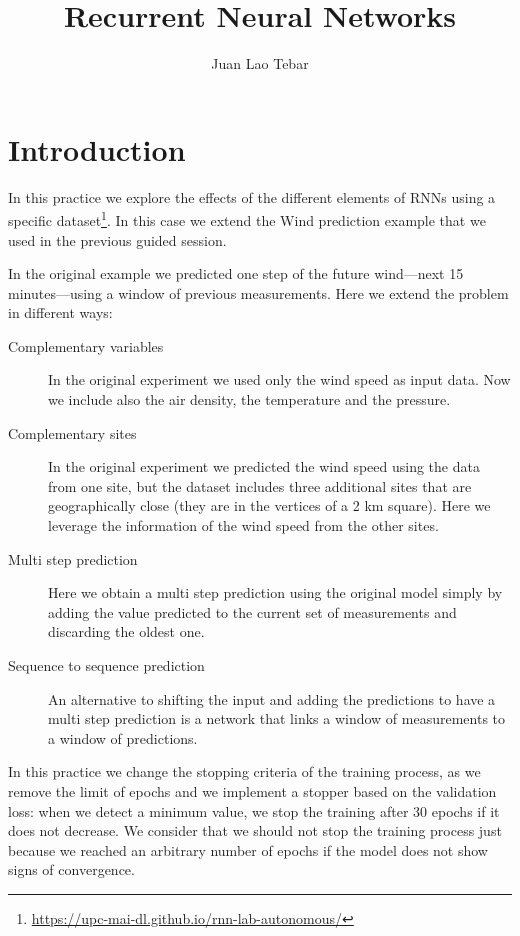 \documentclass[]{article}
\title{Recurrent Neural Networks}
\author{Juan Lao Tebar}
\begin{document}
	
	\maketitle
	
	\section{Introduction} 

	In this practice we explore the effects of the different elements of RNNs using a specific dataset\footnote{\url{https://upc-mai-dl.github.io/rnn-lab-autonomous/}}. In this case we extend the Wind prediction example that we used in the previous guided session.
	
	In the original example we predicted one step of the future wind---next 15 minutes---using a window of previous measurements. Here we extend the problem in different ways:
	
	\begin{description}
		\item [Complementary variables] In the original experiment we used only the wind speed as input data. Now we include also the air density, the temperature and the pressure.
		
		\item [Complementary sites] In the original experiment we predicted the wind speed using the data from one site, but the dataset includes three additional sites that are geographically close (they are in the vertices of a 2 km square). Here we leverage the information of the wind speed from the other sites.
		
		\item [Multi step prediction] Here we obtain a multi step prediction using the original model simply by adding the value predicted to the current set of measurements and discarding the oldest one.
		
		\item [Sequence to sequence prediction] An alternative to shifting the input and adding the predictions to have a multi step prediction is a network that links a window of measurements to a window of predictions.
	\end{description}
	
	In this practice we change the stopping criteria of the training process, as we remove the limit of epochs and we implement a stopper based on the validation loss: when we detect a minimum value, we stop the training after 30 epochs if it does not decrease. We consider that we should not stop the training process just because we reached an arbitrary number of epochs if the model does not show signs of convergence.
	
\end{document}
